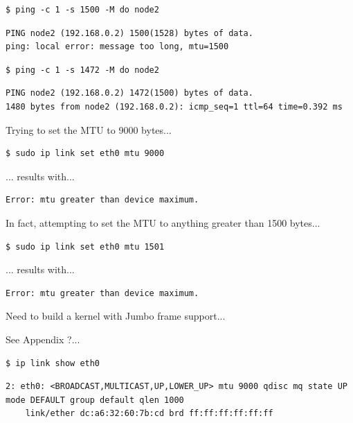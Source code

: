\documentclass{report}
\begin{document}
\lstset{style=type}
\begin{lstlisting}
$ ping -c 1 -s 1500 -M do node2
\end{lstlisting}

\lstset{style=type}
\begin{lstlisting}
PING node2 (192.168.0.2) 1500(1528) bytes of data.
ping: local error: message too long, mtu=1500
\end{lstlisting}


\lstset{style=type}
\begin{lstlisting}
$ ping -c 1 -s 1472 -M do node2
\end{lstlisting}


\lstset{style=type}
\begin{lstlisting}
PING node2 (192.168.0.2) 1472(1500) bytes of data.
1480 bytes from node2 (192.168.0.2): icmp_seq=1 ttl=64 time=0.392 ms
\end{lstlisting}


Trying to set the MTU to 9000 bytes...

\lstset{style=type}
\begin{lstlisting}
$ sudo ip link set eth0 mtu 9000 
\end{lstlisting}

... results with...

\lstset{style=type}
\begin{lstlisting}
Error: mtu greater than device maximum.
\end{lstlisting}

In fact, attempting to set the MTU to anything greater than 1500 bytes...

\lstset{style=type}
\begin{lstlisting}
$ sudo ip link set eth0 mtu 1501 
\end{lstlisting}

... results with...

\lstset{style=type}
\begin{lstlisting}
Error: mtu greater than device maximum.
\end{lstlisting}


Need to build a kernel with Jumbo frame support...

See Appendix ?...

\lstset{style=type}
\begin{lstlisting}
$ ip link show eth0
\end{lstlisting}

\lstset{style=type}
\begin{lstlisting}
2: eth0: <BROADCAST,MULTICAST,UP,LOWER_UP> mtu 9000 qdisc mq state UP mode DEFAULT group default qlen 1000
    link/ether dc:a6:32:60:7b:cd brd ff:ff:ff:ff:ff:ff
\end{lstlisting}
\end{document}
